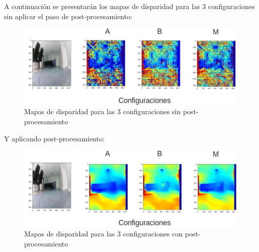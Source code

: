 A continuación se presentarán los mapas de disparidad para las 3 configuraciones sin aplicar el paso de post-procesamiento:
\begin{figure}[H]
    \centering
    \includegraphics[scale=0.6]{Recursos/disparity_maps_without_postprocessing_results.jpg}
    \caption{Mapas de disparidad para las 3 configuraciones sin post-procesamiento}
    \label{disparity_without_postprocess}
\end{figure}
Y aplicando post-procesamiento:
\begin{figure}[H]
    \centering
    \includegraphics[scale=0.6]{Recursos/disparity_maps_with_postprocessing_results.jpg}
    \caption{Mapas de disparidad para las 3 configuraciones con post-procesamiento}
    \label{disparity_with_postprocess}
\end{figure}

